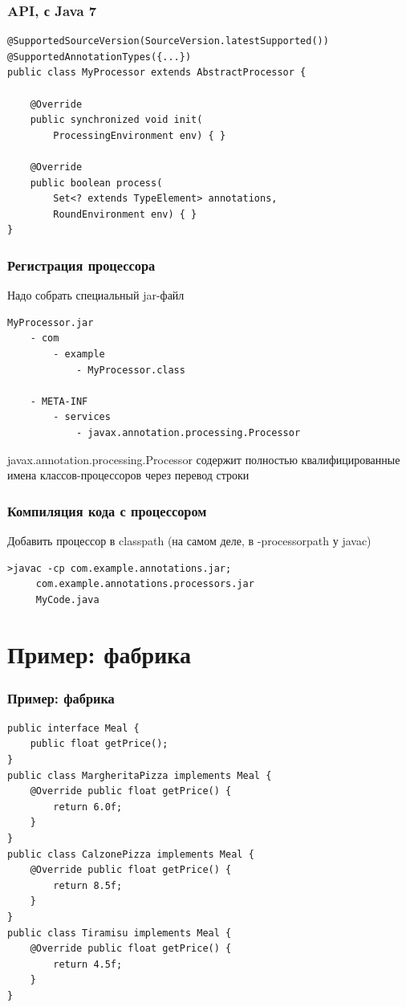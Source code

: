 \documentclass[xetex,mathserif,serif]{beamer}
\begin{document}
	\begin{frame}[fragile]
		\frametitle{API, с Java 7}
		\begin{small}
			\begin{verbatim}
@SupportedSourceVersion(SourceVersion.latestSupported())
@SupportedAnnotationTypes({...})
public class MyProcessor extends AbstractProcessor {

    @Override
    public synchronized void init(
        ProcessingEnvironment env) { }

    @Override
    public boolean process(
        Set<? extends TypeElement> annotations, 
        RoundEnvironment env) { }
}
			\end{verbatim}
		\end{small}
	\end{frame}

	\begin{frame}[fragile]
		\frametitle{Регистрация процессора}
		Надо собрать специальный jar-файл
		\begin{verbatim}
MyProcessor.jar
    - com
        - example
            - MyProcessor.class

    - META-INF
        - services
            - javax.annotation.processing.Processor
		\end{verbatim}
		javax.annotation.processing.Processor содержит полностью квалифицированные имена классов-процессоров через перевод строки
	\end{frame}

	\begin{frame}[fragile]
		\frametitle{Компиляция кода с процессором}
		Добавить процессор в classpath (на самом деле, в -processorpath у javac)
		\vspace{1cm}
		\begin{verbatim}
>javac -cp com.example.annotations.jar;
     com.example.annotations.processors.jar
     MyCode.java
		\end{verbatim}
	\end{frame}

	\section{Пример: фабрика}

		\begin{frame}[fragile]
		\frametitle{Пример: фабрика}
		\begin{footnotesize}
			\begin{verbatim}
public interface Meal {
    public float getPrice();
}
public class MargheritaPizza implements Meal {
    @Override public float getPrice() {
        return 6.0f;
    }
}
public class CalzonePizza implements Meal {
    @Override public float getPrice() {
        return 8.5f;
    }
}
public class Tiramisu implements Meal {
    @Override public float getPrice() {
        return 4.5f;
    }
}
			\end{verbatim}
		\end{footnotesize}
	\end{frame}
\end{document}
